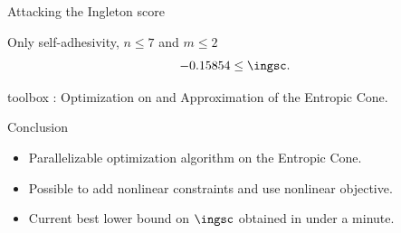 \documentclass[10pt,svgnames,usenames,table]{beamer}
\begin{document}
  \begin{frame}{Attacking the Ingleton score}
    \begin{block}{Only self-adhesivity, $n \leq 7$ and $m \leq 2$}
      \[ -0.15854 \leq \ingsc. \]
    \end{block}
  \end{frame}

  \begin{frame}{ toolbox}
     : Optimization on and Approximation of the Entropic Cone.

    \begin{center}
    \end{center}
  \end{frame}

  \begin{frame}{Conclusion}
    \begin{itemize}
      \item Parallelizable optimization algorithm on the Entropic Cone.
      \item Possible to add nonlinear constraints and use nonlinear objective.
      \item Current best lower bound on $\ingsc$ obtained in under a minute.
    \end{itemize}
  \end{frame}
\end{document}
